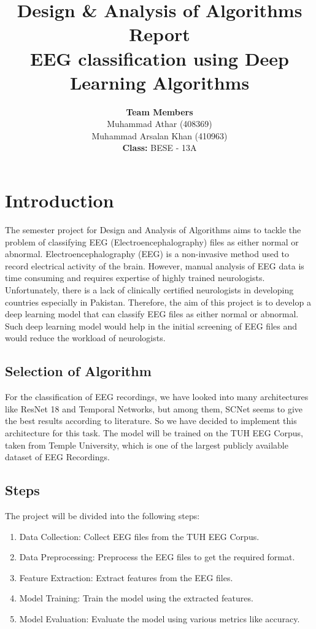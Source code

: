 \documentclass[10pt]{article}
\title{\textbf{Design \& Analysis of Algorithms Report \\ \vspace{5mm} EEG classification using Deep Learning Algorithms}}
\author{\textbf{Team Members} \vspace{1mm} \\ Muhammad Athar (408369) \\ Muhammad Arsalan Khan (410963) \vspace{5mm} \\ \textbf{Class: }BESE - 13A}
\begin{document}
\maketitle

\tableofcontents
\newpage

\justifying
\section{Introduction}
The semester project for Design and Analysis of Algorithms aims to tackle the problem of classifying EEG (Electroencephalography) files as either normal or abnormal.
Electroencephalography (EEG) is a non-invasive method used to record electrical activity of the brain. However, manual analysis of EEG data is time consuming and requires expertise of highly trained neurologists. Unfortunately, there is a lack of clinically certified neurologists in developing countries especially in Pakistan. Therefore, the aim of this project is to develop a deep learning model that can classify EEG files as either normal or abnormal. Such deep learning model would help in the initial screening of EEG files and would reduce the workload of neurologists.

\subsection{Selection of Algorithm}
For the classification of EEG recordings, we have looked into many architectures like ResNet 18 and Temporal Networks, but among them, SCNet seems to give the best results according to literature. So we have decided to implement this architecture for this task. The model will be trained on the TUH EEG Corpus, taken from Temple University, which is one of the largest publicly available dataset of EEG Recordings.

\subsection{Steps}
The project will be divided into the following steps:
\begin{enumerate}
    \item Data Collection: Collect EEG files from the TUH EEG Corpus.
    \item Data Preprocessing: Preprocess the EEG files to get the required format.
    \item Feature Extraction: Extract features from the EEG files.
    \item Model Training: Train the model using the extracted features.
    \item Model Evaluation: Evaluate the model using various metrics like accuracy.
\end{enumerate}
\end{document}
